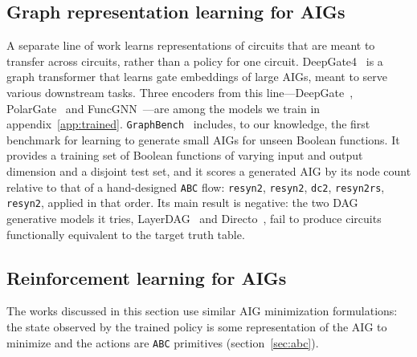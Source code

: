 \documentclass{article}
\begin{document}
\subsection{Graph representation learning for AIGs}
A separate line of work learns representations of circuits that are meant to transfer across circuits, rather than a policy for one circuit.
DeepGate4~\cite{chipgrl} is a graph transformer that learns gate embeddings of large AIGs, meant to serve various downstream tasks.
Three encoders from this line---DeepGate~\cite{deepgate}, PolarGate~\cite{polargate} and FuncGNN~\cite{funcgnn}---are among the models we train in appendix~\ref{app:trained}.
\texttt{GraphBench}~\cite{graphbench} includes, to our knowledge, the first benchmark for learning to generate small AIGs for unseen Boolean functions.
It provides a training set of Boolean functions of varying input and output dimension and a disjoint test set, and it scores a generated AIG by its node count relative to that of a hand-designed \texttt{ABC} flow: \texttt{resyn2}, \texttt{resyn2}, \texttt{dc2}, \texttt{resyn2rs}, \texttt{resyn2}, applied in that order.
Its main result is negative: the two DAG generative models it tries, LayerDAG~\cite{layerdag} and Directo~\cite{directo}, fail to produce circuits functionally equivalent to the target truth table.

\subsection{Reinforcement learning for AIGs}\label{sec:related-rl}
The works discussed in this section use similar AIG minimization formulations: the state observed by the trained policy is some representation of the AIG to minimize and the actions are \texttt{ABC} primitives (section~\ref{sec:abc}).
\end{document}
